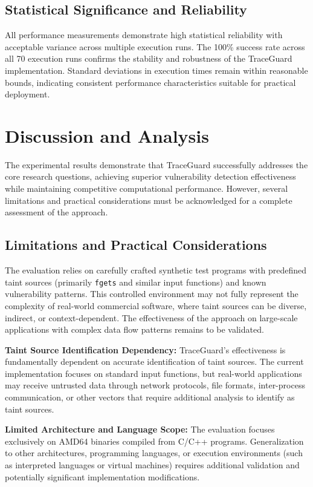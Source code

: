 \subsection{Statistical Significance and Reliability}

All performance measurements demonstrate high statistical reliability with acceptable variance across multiple execution runs. The 100\% success rate across all 70 execution runs confirms the stability and robustness of the TraceGuard implementation. Standard deviations in execution times remain within reasonable bounds, indicating consistent performance characteristics suitable for practical deployment.

\section{Discussion and Analysis}

The experimental results demonstrate that TraceGuard successfully addresses the core research questions, achieving superior vulnerability detection effectiveness while maintaining competitive computational performance. However, several limitations and practical considerations must be acknowledged for a complete assessment of the approach.

\subsection{Limitations and Practical Considerations} The evaluation relies on carefully crafted synthetic test programs with predefined taint sources (primarily \texttt{fgets} and similar input functions) and known vulnerability patterns. This controlled environment may not fully represent the complexity of real-world commercial software, where taint sources can be diverse, indirect, or context-dependent. The effectiveness of the approach on large-scale applications with complex data flow patterns remains to be validated.

\textbf{Taint Source Identification Dependency:} TraceGuard's effectiveness is fundamentally dependent on accurate identification of taint sources. The current implementation focuses on standard input functions, but real-world applications may receive untrusted data through network protocols, file formats, inter-process communication, or other vectors that require additional analysis to identify as taint sources.

\textbf{Limited Architecture and Language Scope:} The evaluation focuses exclusively on AMD64 binaries compiled from C/C++ programs. Generalization to other architectures, programming languages, or execution environments (such as interpreted languages or virtual machines) requires additional validation and potentially significant implementation modifications.

